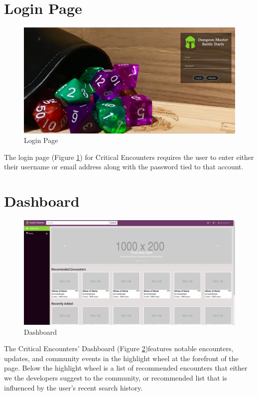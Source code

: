 \documentclass[12pt,a4paper]{report}
\begin{document}
	\section{Login Page}
	\begin{figure}
		\centering
		\includegraphics[scale=.20]{login}
		\caption{Login Page}
		\label{fig: Login Page}
	\end{figure}
	The login page (Figure \ref{fig: Login Page}) for Critical Encounters requires the user to enter either their username or email address along with the password tied to that account.
	\newpage
	\section{Dashboard}
	\begin{figure}[!h]
		\centering
		\includegraphics[scale=.20]{home}
		\caption{Dashboard}
		\label{fig: Dashboard}
	\end{figure}
	The Critical Encounters' Dashboard (Figure \ref{fig: Dashboard})features notable encounters, updates, and community events in the highlight wheel at the forefront of the page. Below the highlight wheel is a list of recommended encounters that either we the developers suggest to the community, or recommended list that is influenced by the user's recent search history.
\end{document}
